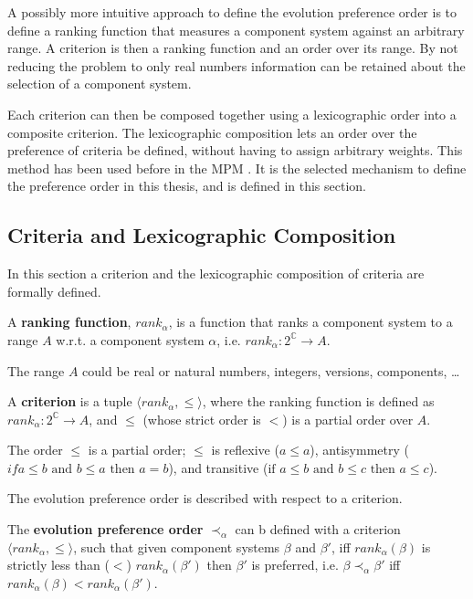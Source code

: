A possibly more intuitive approach to define the evolution preference order is to define a ranking function that measures a component system against an arbitrary range.
A criterion is then a ranking function and an order over its range. 
By not reducing the problem to only real numbers information can be retained about the selection of a component system.

Each criterion can then be composed together using a lexicographic order into a composite criterion.
The lexicographic composition lets an order over the preference of criteria be defined, without having to assign arbitrary weights.
This method has been used before in the MPM \citep{abate2011}.
It is the selected mechanism to define the preference order in this thesis, and is defined in this section.

\subsection{Criteria and Lexicographic Composition}
In this section a criterion and the lexicographic composition of criteria are formally defined.

\begin{defs}
A \textbf{ranking function}, $rank_{\alpha}$, is a function that ranks a component system to a range $A$ w.r.t. a component system $\alpha$, i.e. $rank_{\alpha} : 2^{\mathbb{C}} \rightarrow A$.
\end{defs}
The range $A$ could be real or natural numbers, integers, versions, components, \ldots

\begin{defs}
\label{formal.defcriteria}
A \textbf{criterion} is a tuple $\langle rank_{\alpha}, \leq \rangle$, 
where the ranking function is defined as $rank_{\alpha} : 2^{\mathbb{C}} \rightarrow A$, and $\leq$ (whose strict order is $<$) is a partial order over $A$.
\end{defs}
The order $\leq$ is a partial order; $\leq$ is reflexive ($a \leq a$), antisymmetry ($if a \leq b \text{ and } b \leq a \text{ then } a = b$), and transitive ($ \text{if } a \leq b  \text{ and } b \leq c  \text{ then } a \leq c$).

The evolution preference order is described with respect to a criterion.
\begin{defs}
\label{formal.defcrittooptimal}
The \textbf{evolution preference order} $\prec_{\alpha}$ can b defined with a criterion $\langle rank_{\alpha}, \leq \rangle$,
such that given component systems $\beta$ and $\beta'$, iff $rank_{\alpha}(\beta)$ is strictly less than ($<$) $rank_{\alpha}(\beta')$ then $\beta'$ is preferred, 
i.e. $\beta \prec_{\alpha} \beta'$ iff $rank_{\alpha}(\beta) < rank_{\alpha}(\beta')$.
\end{defs}


